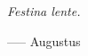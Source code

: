 \begin{center}
    \textit{Festina lente.}
\end{center}
\begin{flushright}
    ----- Augustus
\end{flushright}
